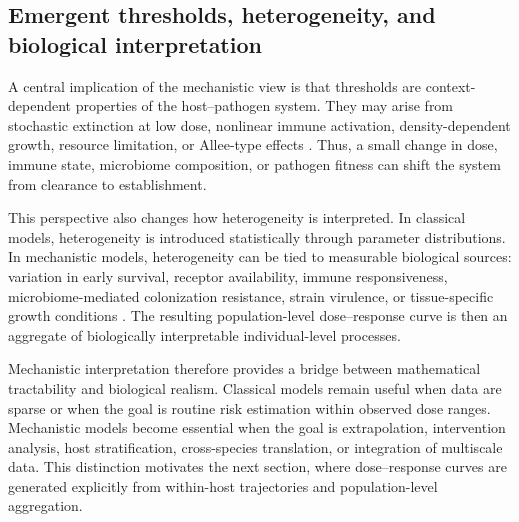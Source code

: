 \documentclass[11pt]{article}
\begin{document}



\subsection{Emergent thresholds, heterogeneity, and biological interpretation}

A central implication of the mechanistic view is that thresholds are context-dependent properties of the host--pathogen system. They may arise from stochastic extinction at low dose, nonlinear immune activation, density-dependent growth, resource limitation, or Allee-type effects \cite{Antia1994ImmuneClearance,Levin2001WithinHost,Rahman2016Listeria}. Thus, a small change in dose, immune state, microbiome composition, or pathogen fitness can shift the system from clearance to establishment.

This perspective also changes how heterogeneity is interpreted. In classical models, heterogeneity is introduced statistically through parameter distributions. In mechanistic models, heterogeneity can be tied to measurable biological sources: variation in early survival, receptor availability, immune responsiveness, microbiome-mediated colonization resistance, strain virulence, or tissue-specific growth conditions \cite{NASEM2018MicrobiomeRisk,Pouillot2015Listeria,Thaiss2016Microbiome}. The resulting population-level dose--response curve is then an aggregate of biologically interpretable individual-level processes.

Mechanistic interpretation therefore provides a bridge between mathematical tractability and biological realism. Classical models remain useful when data are sparse or when the goal is routine risk estimation within observed dose ranges. Mechanistic models become essential when the goal is extrapolation, intervention analysis, host stratification, cross-species translation, or integration of multiscale data. This distinction motivates the next section, where dose--response curves are generated explicitly from within-host trajectories and population-level aggregation. 

%
\end{document}

